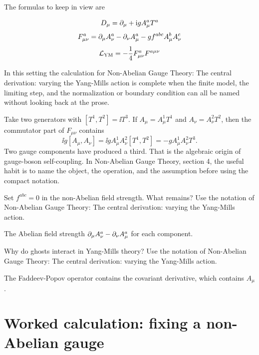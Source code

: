 The formulas to keep in view are

\[
  D_\mu=\partial_\mu+\mathrm i gA_\mu^aT^a
\]
\[
  F_{\mu\nu}^a=\partial_\mu A_\nu^a-\partial_\nu A_\mu^a-gf^{abc}A_\mu^bA_\nu^c
\]
\[
  \mathcal L_{\mathrm{YM}}=-\frac14F_{\mu\nu}^aF^{a\mu\nu}
\]

In this setting the calculation for Non-Abelian Gauge Theory: The central derivation: varying the Yang-Mills action is complete when the finite model, the limiting step, and the normalization or boundary condition can all be named without looking back at the prose.




\begin{example}
Take two generators with \([T^1,T^2]=\ii T^3\).  If \(A_\mu=A_\mu^1T^1\) and \(A_\nu=A_\nu^2T^2\), then the commutator part of \(F_{\mu\nu}\) contains
\[
  \ii g[A_\mu,A_\nu]=\ii gA_\mu^1A_\nu^2[T^1,T^2]=-gA_\mu^1A_\nu^2T^3.
\]
Two gauge components have produced a third.  That is the algebraic origin of gauge-boson self-coupling.  In Non-Abelian Gauge Theory, section 4, the useful habit is to name the object, the operation, and the assumption before using the compact notation.
\end{example}



\begin{exercise}
Set \(f^{abc}=0\) in the non-Abelian field strength.  What remains?  Use the notation of Non-Abelian Gauge Theory: The central derivation: varying the Yang-Mills action.
\begin{answer}
The Abelian field strength \(\partial_\mu A_\nu^a-\partial_\nu A_\mu^a\) for each component.
\end{answer}
\end{exercise}

\begin{exercise}
Why do ghosts interact in Yang-Mills theory?  Use the notation of Non-Abelian Gauge Theory: The central derivation: varying the Yang-Mills action.
\begin{answer}
The Faddeev-Popov operator contains the covariant derivative, which contains \(A_\mu\).
\end{answer}
\end{exercise}



\section{Worked calculation: fixing a non-Abelian gauge}

